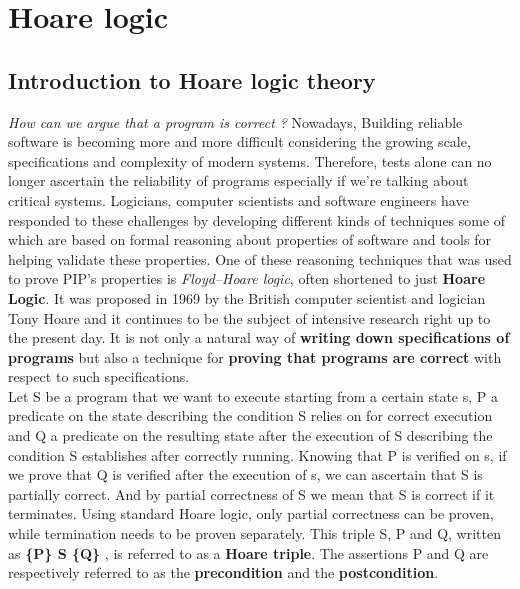 \section{Hoare logic}

\subsection{Introduction to Hoare logic theory} \label{HoareIntro}
\textit{How can we argue that a program is correct ?}
Nowadays, Building reliable software is becoming more and more difficult considering the growing scale, specifications and complexity of modern systems. Therefore, tests alone can no longer ascertain the reliability of programs especially if we're talking about critical systems. Logicians, computer scientists and software engineers have responded to these challenges by developing different kinds of techniques some of which are based on formal reasoning about properties of software and tools for helping validate these properties. One of these reasoning techniques that was used to prove PIP's properties is \textit{Floyd–Hoare logic}, often shortened to just \textbf{Hoare Logic}. It was proposed in 1969 by the British computer scientist and logician Tony Hoare and it continues to be the subject of intensive research right up to the present day. It is not only a natural way of \textbf{writing down specifications of programs} but also a technique for \textbf{proving that programs are correct} with respect to such specifications.\\ %

Let S be a program that we want to execute starting from a certain state s, P a predicate on the state describing the condition S relies on for correct execution and Q a predicate on the resulting state after the execution of S describing the condition S establishes after correctly running. Knowing that P is verified on s, if we prove that Q is verified after the execution of s, we can ascertain that S is partially correct. And by partial correctness of S we mean that S is correct if it terminates. Using standard Hoare logic, only partial correctness can be proven, while termination needs to be proven separately. This triple S, P and Q, written as \textbf{ \{P\} S \{Q\} }, is referred to as a \textbf{Hoare triple}. The assertions P and Q are respectively referred to as the \textbf{precondition} and the \textbf{postcondition}. \\

